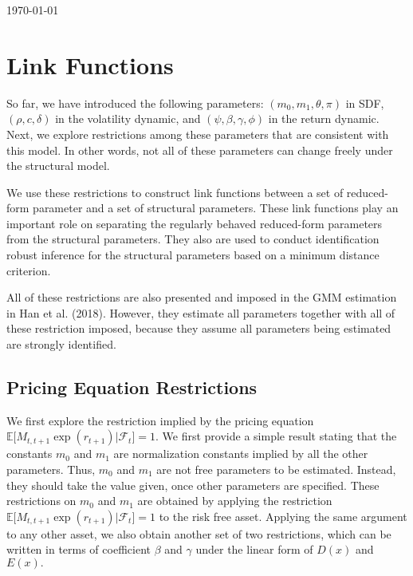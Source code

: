 \documentclass[11pt]{article}
\begin{document}
\noindent 
\today%

\section{Link Functions}

So far, we have introduced the following parameters: $(m_{0},m_{1},\theta
,\pi )$ in SDF, $(\rho ,c,\delta )$ in the volatility dynamic, and $(\psi
,\beta ,\gamma ,\phi )$ in the return dynamic. Next, we explore restrictions
among these parameters that are consistent with this model. In other words,
not all of these parameters can change freely under the structural model.

We use these restrictions to construct link functions between a set of
reduced-form parameter and a set of structural parameters. These link
functions play an important role on separating the regularly behaved
reduced-form parameters from the structural parameters. They also are used
to conduct identification robust inference for the structural parameters
based on a minimum distance criterion.

All of these restrictions are also presented and imposed in the GMM
estimation in Han et al. (2018). However, they estimate all parameters
together with all of these restriction imposed, because they assume all
parameters being estimated are strongly identified.

\subsection{Pricing Equation Restrictions}

We first explore the restriction implied by the pricing equation $\mathbb{E[}%
M_{t,t+1}\exp (r_{t+1})|\mathcal{F}_{t}]=1.$ We first provide a simple
result stating that the constants $m_{0}$ and $m_{1}$ are normalization
constants implied by all the other parameters. Thus, $m_{0}$ and $m_{1}$ are
not free parameters to be estimated. Instead, they should take the value
given, once other parameters are specified. These restrictions on $m_{0}$
and $m_{1}$ are obtained by applying the restriction $\mathbb{E[}%
M_{t,t+1}\exp (r_{t+1})|\mathcal{F}_{t}]=1$ to the risk free asset. Applying
the same argument to any other asset, we also obtain another set of two
restrictions, which can be written in terms of coefficient $\beta $ and $%
\gamma $ under the linear form of $D(x)$ and $E(x).$
\end{document}
